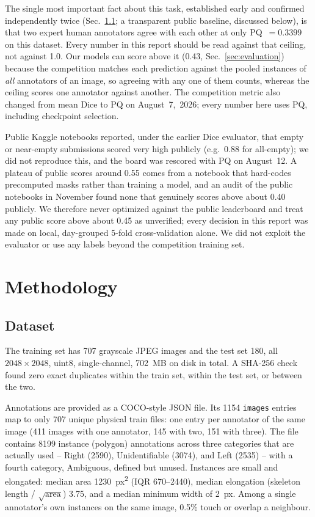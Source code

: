 \documentclass[sigconf]{acmart}
\begin{document}
    The single most important fact about this task, established early and confirmed independently twice (Sec.~\ref{sec:dataset}; a transparent public baseline, discussed below), is that two expert human annotators agree with each other at only PQ~$=0.3399$ on this dataset. Every number in this report should be read against that ceiling, not against 1.0. Our models can score above it (0.43, Sec.~\ref{sec:evaluation}) because the competition matches each prediction against the pooled instances of \emph{all} annotators of an image, so agreeing with any one of them counts, whereas the ceiling scores one annotator against another. The competition metric also changed from mean Dice to PQ on August~7,~2026; every number here uses PQ, including checkpoint selection.

    Public Kaggle notebooks reported, under the earlier Dice evaluator, that empty or near-empty submissions scored very high publicly (e.g.\ 0.88 for all-empty); we did not reproduce this, and the board was rescored with PQ on August~12. A plateau of public scores around 0.55 comes from a notebook that hard-codes precomputed masks rather than training a model, and an audit of the public notebooks in November found none that genuinely scores above about 0.40 publicly. We therefore never optimized against the public leaderboard and treat any public score above about 0.45 as unverified; every decision in this report was made on local, day-grouped 5-fold cross-validation alone. We did not exploit the evaluator or use any labels beyond the competition training set.


\section{Methodology}\label{sec:methodology}

\subsection{Dataset}\label{sec:dataset}
    The training set has 707 grayscale JPEG images and the test set 180, all $2048\times2048$, uint8, single-channel, 702~MB on disk in total. A SHA-256 check found zero exact duplicates within the train set, within the test set, or between the two.

    Annotations are provided as a COCO-style JSON file. Its 1154 \texttt{images} entries map to only 707 unique physical train files: one entry per annotator of the same image (411 images with one annotator, 145 with two, 151 with three). The file contains 8199 instance (polygon) annotations across three categories that are actually used -- Right (2590), Unidentifiable (3074), and Left (2535) -- with a fourth category, Ambiguous, defined but unused. Instances are small and elongated: median area 1230~px\textsuperscript{2} (IQR 670--2440), median elongation (skeleton length / $\sqrt{\text{area}}$) 3.75, and a median minimum width of 2~px. Among a single annotator's own instances on the same image, 0.5\% touch or overlap a neighbour.
\end{document}
